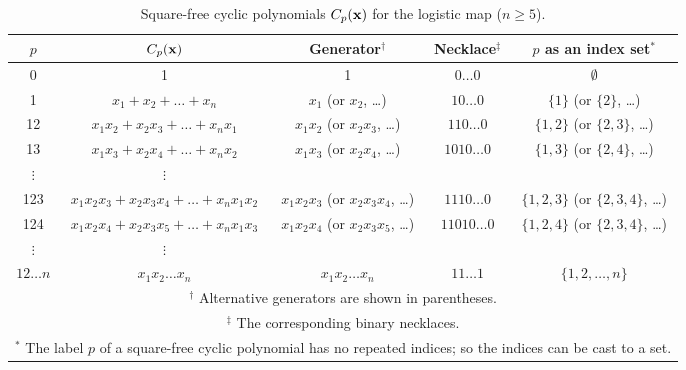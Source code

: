 \documentclass[preprint]{revtex4-1}
\begin{document}
\begin{table}[h]\footnotesize
\caption{Square-free cyclic polynomials $C_p(\mathbf{x})$ for the logistic map ($n \ge 5$).}
\begin{center}
\begin{tabular}{c c c c c}
\hline
$p$ & $C_p(\mathbf{x})$ & Generator$^\dagger$ & Necklace$^\ddagger$ & $p$ as an index set$^*$\\
\hline
0             & 1 & 1 & $0\ldots0$ & $\emptyset$ \\
1             & $x_1 + x_2 + \dots + x_n$
              & $x_1$ (or $x_2$, \ldots)
              & $10\ldots0$
              & $\{1\}$ (or $\{2\}$, \ldots) \\
12            & $x_1 x_2 + x_2 x_3 + \dots + x_n x_1$
              & $x_1 x_2$ (or $x_2 x_3$, \ldots)
              & $110\ldots0$
              & $\{1, 2\}$ (or $\{2, 3\}$, \ldots) \\
13            & $x_1 x_3 + x_2 x_4 + \dots + x_n x_2$
              & $x_1 x_3$ (or $x_2 x_4$, \ldots)
              & $1010\ldots0$
              & $\{1, 3\}$ (or $\{2, 4\}$, \ldots) \\
$\vdots$      & $\vdots$ \\
123           & \hspace{1mm}$x_1 x_2 x_3 + x_2 x_3 x_4 + \dots + x_n x_1 x_2$\hspace{1mm}
              & \hspace{1mm}$x_1 x_2 x_3$ (or $x_2 x_3 x_4$, \ldots)\hspace{1mm}
              & $1110\ldots0$
              & $\{1, 2, 3\}$ (or $\{2, 3, 4\}$, \ldots) \\
124           & $x_1 x_2 x_4 + x_2 x_3 x_5 + \dots + x_n x_1 x_3$
              & $x_1 x_2 x_4$ (or $x_2 x_3 x_5$, \ldots)
              & $11010\ldots0$
              & $\{1, 2, 4\}$ (or $\{2, 3, 4\}$, \ldots) \\
$\vdots$      & $\vdots$ \\
$12\dots n$  & $x_1 x_2 \dots x_n$
              & $x_1 x_2 \dots x_n$
              & $11\ldots1$
              & $\{1, 2, \ldots, n\}$  \\
\hline
\multicolumn{5}{p{\linewidth}}{
$^\dagger$ Alternative generators are shown in parentheses.
}\\
\multicolumn{5}{p{\linewidth}}{
$^\ddagger$ The corresponding binary necklaces.
}\\
\multicolumn{5}{p{\linewidth}}{
$^*$ The label $p$ of a square-free cyclic polynomial
    has no repeated indices;
    so the indices can be cast to a set.
}\\
\hline
\end{tabular}
\end{center}
\label{tab:sqrfreepoly}
\end{table}
\end{document}
